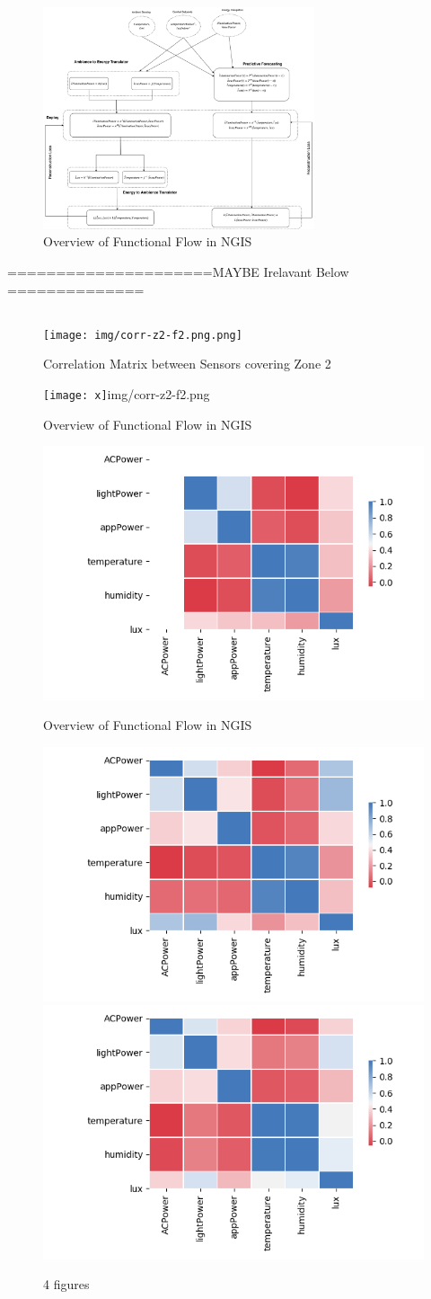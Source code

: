 	
	
	
\begin{figure}
    \centering
    \includegraphics[width= 8cm]{img/LLequation.png}
    \caption{Overview of Functional Flow in NGIS}
    \label{fig:LLequation}
\end{figure}



=====================MAYBE Irelavant Below ==============
\subsection{}
\begin{figure}
    \centering
    \texttt{[image: img/corr-z2-f2.png.png]}
    \caption{Correlation Matrix between Sensors covering Zone 2}
    \label{fig:corr-z2-f2}
\end{figure}



\begin{figure}
\texttt{[image: x]}{img/corr-z2-f2.png}\caption{Overview of Functional Flow in NGIS}
\includegraphics[width=.4\textwidth]{img/corr-z3-f2.png}\caption{Overview of Functional Flow in NGIS}
\includegraphics[width=.4\textwidth]{img/corr-z2-f7.png}
\includegraphics[width=.4\textwidth]{img/2018corr-z2-f7.png}
\caption{ 4 figures}
\end{figure}


